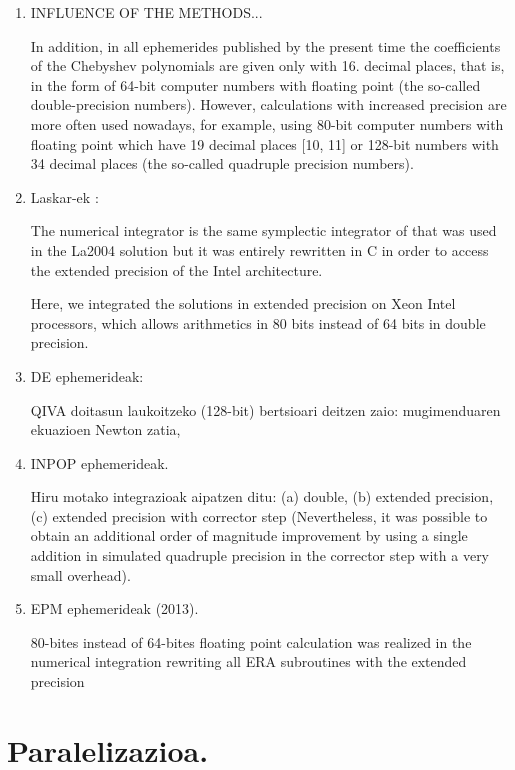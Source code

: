 \begin{enumerate}

\item INFLUENCE OF THE METHODS...

In addition, in all ephemerides published by the present time the coefficients of the Chebyshev polynomials are given only with 16. decimal places, that is, in the form of 64-bit computer numbers with floating point (the so-called double-precision numbers). However, calculations with increased precision are more often used nowadays, for example, using 80-bit computer numbers with floating point which have 19 decimal places [10, 11] or 128-bit numbers with 34 decimal places (the so-called quadruple precision numbers).

\item Laskar-ek \cite{Laskar2011}:

The numerical integrator is the same symplectic integrator of that was used in the La2004 solution but it was entirely rewritten in C in order to access the extended precision of the Intel architecture.

Here, we integrated the solutions in extended precision on Xeon Intel processors, which allows arithmetics in 80 bits instead of 64 bits in double precision.

\item DE ephemerideak:

QIVA doitasun laukoitzeko (128-bit) bertsioari deitzen zaio: mugimenduaren ekuazioen Newton zatia,

\item INPOP ephemerideak.

Hiru motako integrazioak aipatzen ditu: (a) double, (b) extended precision, (c) extended precision with corrector step (Nevertheless, it was possible to obtain an additional order of magnitude improvement by using a single addition in simulated quadruple precision in the corrector step with a very small overhead).

\item EPM ephemerideak (2013).

80-bites instead of 64-bites floating point calculation was realized in the numerical integration
rewriting all ERA subroutines with the extended precision

\end{enumerate}

\section{Paralelizazioa.}

